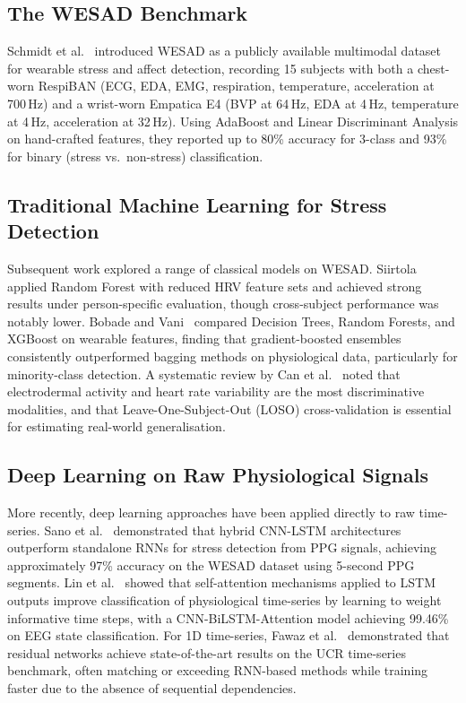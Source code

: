 \documentclass[11pt]{article}
\begin{document}
\subsection{The WESAD Benchmark}
Schmidt et al.~\cite{schmidt2018wesad} introduced WESAD as a publicly available multimodal dataset for wearable stress and affect detection, recording 15 subjects with both a chest-worn RespiBAN (ECG, EDA, EMG, respiration, temperature, acceleration at 700\,Hz) and a wrist-worn Empatica E4 (BVP at 64\,Hz, EDA at 4\,Hz, temperature at 4\,Hz, acceleration at 32\,Hz).
Using AdaBoost and Linear Discriminant Analysis on hand-crafted features, they reported up to 80\% accuracy for 3-class and 93\% for binary (stress vs.\ non-stress) classification.

\subsection{Traditional Machine Learning for Stress Detection}
Subsequent work explored a range of classical models on WESAD.
Siirtola~\cite{siirtola2019continuous} applied Random Forest with reduced HRV feature sets and achieved strong results under person-specific evaluation, though cross-subject performance was notably lower.
Bobade and Vani~\cite{bobade2020stress} compared Decision Trees, Random Forests, and XGBoost on wearable features, finding that gradient-boosted ensembles consistently outperformed bagging methods on physiological data, particularly for minority-class detection.
A systematic review by Can et al.~\cite{can2019stress} noted that electrodermal activity and heart rate variability are the most discriminative modalities, and that Leave-One-Subject-Out (LOSO) cross-validation is essential for estimating real-world generalisation.

\subsection{Deep Learning on Raw Physiological Signals}
More recently, deep learning approaches have been applied directly to raw time-series.
Sano et al.~\cite{sano2023cnnlstm} demonstrated that hybrid CNN-LSTM architectures outperform standalone RNNs for stress detection from PPG signals, achieving approximately 97\% accuracy on the WESAD dataset using 5-second PPG segments.
Lin et al.~\cite{lin2023selfattention} showed that self-attention mechanisms applied to LSTM outputs improve classification of physiological time-series by learning to weight informative time steps, with a CNN-BiLSTM-Attention model achieving 99.46\% on EEG state classification.
For 1D time-series, Fawaz et al.~\cite{fawaz2019resnet} demonstrated that residual networks achieve state-of-the-art results on the UCR time-series benchmark, often matching or exceeding RNN-based methods while training faster due to the absence of sequential dependencies.
\end{document}
